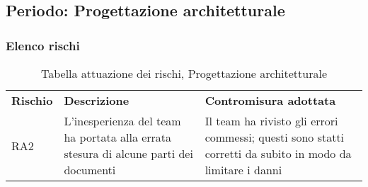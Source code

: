 \subsection{Periodo: Progettazione architetturale}
\subsubsection{Elenco rischi}
\begin{table}[h]
\caption{Tabella attuazione dei rischi, Progettazione architetturale}
\begin{center}
\begin{tabular}{p{2cm}p{6cm}p{6cm}}
\textbf{Rischio} & \textbf{Descrizione}                                                                                                        & \textbf{Contromisura adottata}                                                                                                                                                   \\
RA2              & L'inesperienza del team ha portata alla errata stesura di alcune parti dei documenti & Il team ha rivisto gli errori commessi; questi sono statti corretti da subito in modo da limitare i danni
\end{tabular}
\end{center}
\end{table}